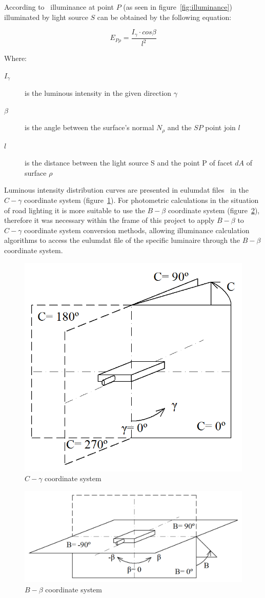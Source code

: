 According to~\cite{Habel} illuminance at point $P$ (as seen in figure~\ref{fig:illuminance}) illuminated by light source $S$ can be obtained by the following equation:

\begin{equation}
E_{P\rho}=\frac{I_{\gamma} \cdot cos \beta}{l^2}
\end{equation}

Where:
\begin{description}
	\item[$I_{\gamma}$] is the luminous intensity in the given direction $\gamma$
	\item[$\beta$] is the angle between the surface's normal $N_{\rho}$ and the $SP$ point join $l$
	\item[$l$] is the distance between the light source S and the point P of facet $dA$ of surface $\rho$
\end{description}

Luminous intensity distribution curves are presented in eulumdat files~\cite{Eulumdat} in the $C-\gamma$ coordinate system (figure~\ref{fig:Cgamma}). For photometric calculations in the situation of road lighting it is more suitable to use the $B-\beta$ coordinate system (figure~\ref{fig:Bbeta}), therefore it was necessary within the frame of this project to apply $B-\beta$ to $C-\gamma$ coordinate system conversion methods, allowing illuminance calculation algorithms to access the eulumdat file of the specific luminaire through the $B-\beta$ coordinate system.

\begin{figure}[htb]
  \centering
  \includegraphics[width=0.65\columnwidth]{Cgama}
  \caption{$C-\gamma$ coordinate system}
  \label{fig:Cgamma}
\end{figure}

\begin{figure}[htb]
  \centering
  \includegraphics[width=\columnwidth]{Bbeta}
  \caption{$B-\beta$ coordinate system}
  \label{fig:Bbeta}
\end{figure}